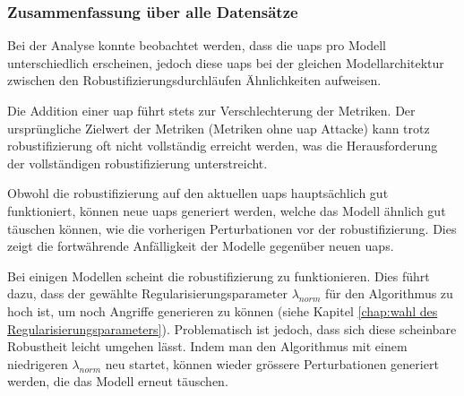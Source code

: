 \subsubsection{Zusammenfassung über alle Datensätze}
Bei der Analyse konnte beobachtet werden, dass die \acrshort{uap}s pro Modell unterschiedlich erscheinen, jedoch diese \acrshort{uap}s bei der gleichen Modellarchitektur zwischen den Robustifizierungsdurchläufen Ähnlichkeiten aufweisen.

Die Addition einer \acrshort{uap} führt stets zur Verschlechterung der Metriken. Der ursprüngliche Zielwert der Metriken (Metriken ohne \acrshort{uap} Attacke) kann trotz \Gls{robustifizierung} oft nicht vollständig erreicht werden, was die Herausforderung der vollständigen \Gls{robustifizierung} unterstreicht.

Obwohl die \Gls{robustifizierung} auf den aktuellen \acrshort{uap}s hauptsächlich gut funktioniert, können neue \acrshort{uap}s generiert werden, welche das Modell ähnlich gut täuschen können, wie die vorherigen Perturbationen vor der \Gls{robustifizierung}. Dies zeigt die fortwährende Anfälligkeit der Modelle gegenüber neuen \acrshort{uap}s.

Bei einigen Modellen scheint die \Gls{robustifizierung} zu funktionieren. Dies führt dazu, dass der gewählte Regularisierungsparameter $\lambda_{norm}$ für den Algorithmus zu hoch ist, um noch Angriffe generieren zu können (siehe Kapitel \ref{chap:wahl des Regularisierungsparameters}). Problematisch ist jedoch, dass sich diese scheinbare Robustheit leicht umgehen lässt. Indem man den Algorithmus mit einem niedrigeren $\lambda_{norm}$ neu startet, können wieder grössere Perturbationen generiert werden, die das Modell erneut täuschen.

